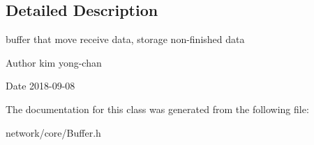 \subsection{Detailed Description}
buffer that move receive data, storage non-\/finished data 

\begin{DoxyAuthor}{Author}
kim yong-\/chan 
\end{DoxyAuthor}
\begin{DoxyDate}{Date}
2018-\/09-\/08 
\end{DoxyDate}


The documentation for this class was generated from the following file\+:\begin{DoxyCompactItemize}
\item 
network/core/Buffer.\+h\end{DoxyCompactItemize}
